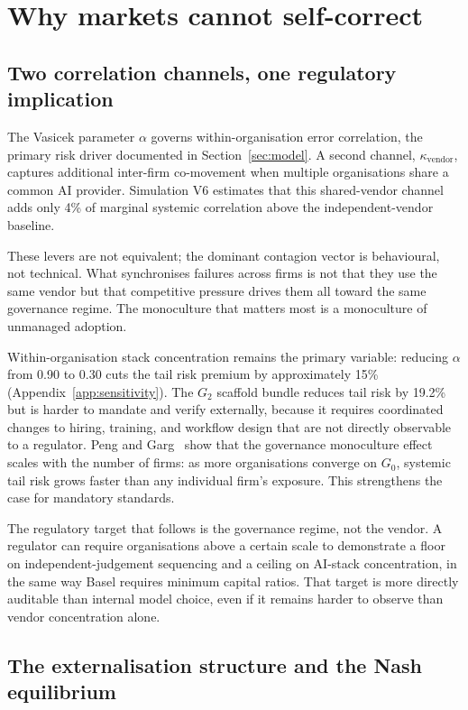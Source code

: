 \documentclass[11pt,a4paper]{article}
\begin{document}
\section{Why markets cannot self-correct}\label{sec:markets}

\subsection{Two correlation channels, one regulatory implication}

The Vasicek parameter $\alpha$ governs within-organisation error
correlation, the primary risk driver documented in Section~\ref{sec:model}.
A second channel, $\kappa_{\text{vendor}}$, captures additional inter-firm
co-movement when multiple organisations share a common AI provider.
Simulation V6 estimates that this shared-vendor channel adds only 4\% of
marginal systemic correlation above the independent-vendor baseline.

These levers are not equivalent; the dominant contagion vector is
behavioural, not technical. What synchronises failures across firms is not
that they use the same vendor but that competitive pressure drives them all
toward the same governance regime. The monoculture that matters most is a
monoculture of unmanaged adoption.

Within-organisation stack concentration remains the primary variable:
reducing $\alpha$ from 0.90 to 0.30 cuts the tail risk premium by
approximately 15\% (Appendix~\ref{app:sensitivity}). The $G_2$ scaffold bundle
reduces tail risk by 19.2\% but is harder to mandate and verify externally,
because it requires coordinated changes to hiring, training, and workflow
design that are not directly observable to a
regulator. Peng and Garg~\cite{peng_neurips_2024} show that the governance
monoculture effect scales with the number of firms: as more organisations
converge on $G_0$, systemic tail risk grows faster than any individual
firm's exposure. This strengthens the case for mandatory standards.

The regulatory target that follows is the governance regime, not the vendor.
A regulator can require organisations above a certain scale to demonstrate a
floor on independent-judgement sequencing and a ceiling on AI-stack
concentration, in the same way Basel requires minimum capital ratios. That
target is more directly auditable than internal model choice, even if it
remains harder to observe than vendor concentration alone.

\subsection{The externalisation structure and the Nash equilibrium}
\end{document}
